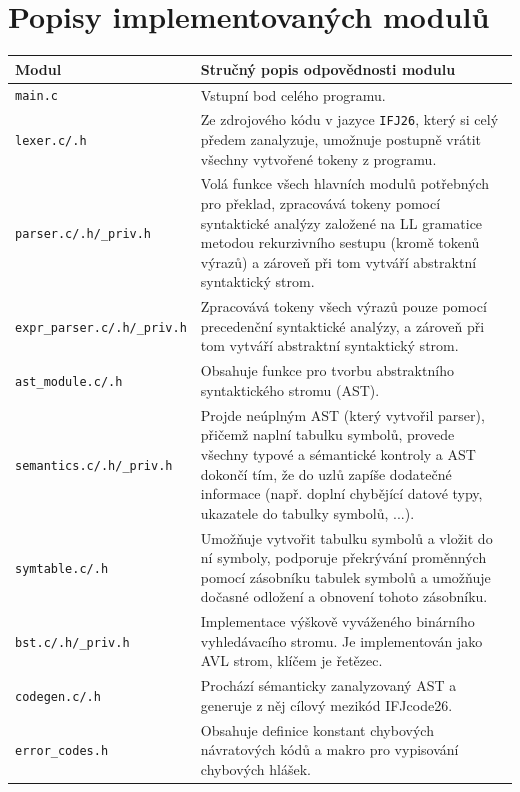 \documentclass[10pt,a4paper]{article}
\begin{document}
\newpage
\section{Popisy implementovaných modulů}

\renewcommand{\arraystretch}{1.2}
\begin{longtable}{p{}p{}}
    \toprule
    \textbf{Modul} & \textbf{Stručný popis odpovědnosti modulu} \\
    \midrule
    \texttt{main.c} & Vstupní bod celého programu. \\
    \texttt{lexer.c/.h} & Ze zdrojového kódu v jazyce \texttt{IFJ26}, který si
     celý předem zanalyzuje, umožnuje postupně vrátit všechny vytvořené tokeny
      z programu.  \\
    \texttt{parser.c/.h/\_priv.h} & Volá funkce všech hlavních modulů potřebných
     pro překlad, zpracovává tokeny pomocí syntaktické analýzy založené na 
     LL gramatice metodou rekurzivního sestupu (kromě tokenů výrazů) a zároveň 
     při tom vytváří abstraktní syntaktický strom. \\
    \texttt{expr\_parser.c/.h/\_priv.h} & Zpracovává tokeny všech výrazů pouze pomocí
     precedenční syntaktické analýzy, a zároveň při tom vytváří abstraktní 
     syntaktický strom. \\
    \texttt{ast\_module.c/.h} & Obsahuje funkce pro tvorbu abstraktního
     syntaktického stromu (AST). \\
    \texttt{semantics.c/.h/\_priv.h} & Projde neúplným AST (který vytvořil parser),
     přičemž naplní tabulku symbolů, provede všechny typové a sémantické kontroly 
     a AST dokončí tím, že do uzlů zapíše dodatečné informace 
     (např. doplní chybějící datové typy, ukazatele do tabulky symbolů, ...).\\
    \texttt{symtable.c/.h} & Umožňuje vytvořit tabulku symbolů a vložit do ní symboly,
     podporuje překrývání proměnných pomocí zásobníku tabulek symbolů a umožňuje
      dočasné odložení a obnovení tohoto zásobníku. \\
    \texttt{bst.c/.h/\_priv.h} & Implementace výškově vyváženého 
    binárního vyhledávacího stromu. Je implementován jako AVL strom, klíčem 
    je řetězec. \\
    \texttt{codegen.c/.h} & Prochází sémanticky zanalyzovaný AST a generuje
     z něj cílový mezikód IFJcode26. \\
     
    \texttt{error\_codes.h} & Obsahuje definice konstant chybových 
    návratových kódů a makro pro vypisování chybových hlášek. \\
     
    \bottomrule
\end{longtable}
\end{document}
